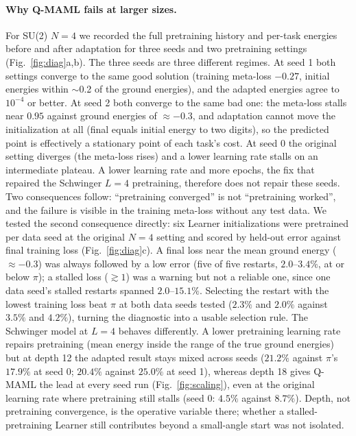 \paragraph{Why Q-MAML fails at larger sizes.} For SU(2) $N{=}4$ we recorded the full pretraining history and per-task energies before and after adaptation for three seeds and two pretraining settings (Fig.~\ref{fig:diag}a,b). The three seeds are three different regimes. At seed 1 both settings converge to the same good solution (training meta-loss $-0.27$, initial energies within $\sim$0.2 of the ground energies), and the adapted energies agree to $10^{-4}$ or better. At seed 2 both converge to the same bad one: the meta-loss stalls near $0.95$ against ground energies of $\approx-0.3$, and adaptation cannot move the initialization at all (final equals initial energy to two digits), so the predicted point is effectively a stationary point of each task's cost. At seed 0 the original setting diverges (the meta-loss rises) and a lower learning rate stalls on an intermediate plateau. A lower learning rate and more epochs, the fix that repaired the Schwinger $L{=}4$ pretraining, therefore does not repair these seeds. Two consequences follow: ``pretraining converged'' is not ``pretraining worked'', and the failure is visible in the training meta-loss without any test data. We tested the second consequence directly: six Learner initializations were pretrained per data seed at the original $N{=}4$ setting and scored by held-out error against final training loss (Fig.~\ref{fig:diag}c). A final loss near the mean ground energy ($\approx-0.3$) was always followed by a low error (five of five restarts, $2.0$--$3.4\%$, at or below $\pi$); a stalled loss ($\gtrsim1$) was a warning but not a reliable one, since one data seed's stalled restarts spanned $2.0$--$15.1\%$. Selecting the restart with the lowest training loss beat $\pi$ at both data seeds tested ($2.3\%$ and $2.0\%$ against $3.5\%$ and $4.2\%$), turning the diagnostic into a usable selection rule. The Schwinger model at $L{=}4$ behaves differently. A lower pretraining learning rate repairs pretraining (mean energy inside the range of the true ground energies) but at depth 12 the adapted result stays mixed across seeds ($21.2\%$ against $\pi$'s $17.9\%$ at seed 0; $20.4\%$ against $25.0\%$ at seed 1), whereas depth 18 gives Q-MAML the lead at every seed run (Fig.~\ref{fig:scaling}), even at the original learning rate where pretraining still stalls (seed 0: $4.5\%$ against $8.7\%$). Depth, not pretraining convergence, is the operative variable there; whether a stalled-pretraining Learner still contributes beyond a small-angle start was not isolated.

